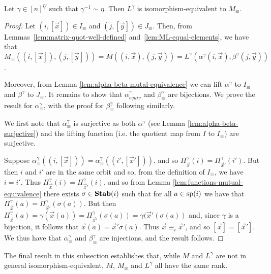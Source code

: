 \documentclass[../paper.tex]{subfiles}
\begin{document}
\begin{thm}
	Let $\gamma \in [n]^{\underline{U}}$ such that $\gamma^{-1} \sim \eta$. Then
  $L^{\gamma}$ is isomorphism-equivalent to $M_{\equiv}$.
	\label{thm:LM-equivalence}
\end{thm}
\begin{proof}
	Let $(i, [\vec{x}]) \in I_\equiv$ and $(j, [\vec{y}]) \in J_\equiv$. Then,
  from Lemmas~\ref{lem:matrix-quot-well-defined}
  and~\ref{lem:ML-equal-elements}, we have that $M_\equiv ((i, [\vec{x}]), (j,
  [\vec{y}])) = M ((i, \vec{x}), (j, \vec{y})) = L^{\gamma}(\alpha^{\gamma}(i,
  \vec{x}), \beta^{\gamma}(j, \vec{y}))$.
		
	Moreover, from Lemma \ref{lem:alpha-beta-mutal-equivalence} we can lift
  $\alpha^\gamma$ to $I_\equiv$ and $\beta^{\gamma}$ to $J_\equiv$. It remains
  to show that $\alpha^\gamma_{equiv}$ and $\beta^{\gamma}_{\equiv}$ are
  bijections. We prove the result for $\alpha^{\gamma}_{\equiv}$, with the proof
  for $\beta^\gamma_\equiv$ following similarly.
		
	We first note that $\alpha^{\gamma}_{\equiv}$ is surjective as both
  $\alpha^{\gamma}$ (see Lemma \ref{lem:alpha-beta-surjective}) and the lifting
  function (i.e. the quotient map from $I$ to $I_\equiv$) are surjective.
		
	Suppose $\alpha^{\gamma}_\equiv((i, [\vec{x}])) = \alpha^{\gamma}_\equiv((i',
  [\vec{x}']))$, and so $\Pi^{\gamma}_{\vec{x}}(i) =
  \Pi^{\gamma}_{\vec{x}'}(i')$. But then $i$ and $i'$ are in the same orbit and
  so, from the definition of $I_{\equiv}$, we have $i = i'$. Thus
  $\Pi^{\gamma}_{\vec{x}}(i) = \Pi^{\gamma}_{\vec{x}'}(i)$, and so from Lemma
  \ref{lem:functions-mutual-equivalence} there exists $\sigma \in
  \text{\textbf{Stab}}(i)$ such that for all $a \in \text{sp}(i)$ we have
  that $\Pi^{\gamma}_{\vec{x}}(a) = \Pi^{\gamma}_{\vec{x}'} (\sigma (a))$. But
  then $\Pi^{\gamma}_{\vec{x}}(a) = \gamma (\vec{x}(a)) =
  \Pi^{\gamma}_{\vec{x}'}(\sigma (a)) = \gamma (\vec{x}' (\sigma (a))$ and,
  since $\gamma$ is a bijection, it follows that $\vec{x}(a) = \vec{x}' \sigma
  (a)$. Thus $\vec{x} \equiv_i \vec{x}'$, and so $[\vec{x}] = [\vec{x}']$. We
  thus have that $\alpha^{\gamma}_\equiv$ and $\beta^{\gamma}_\equiv$ are
  injections, and the result follows.
\end{proof}

The final result in this subsection establishes that, while $M$ and $L^{\gamma}$
are not in general isomorphism-equivalent, $M$, $M_\equiv$ and $L^{\gamma}$ all
have the same rank.
\end{document}
